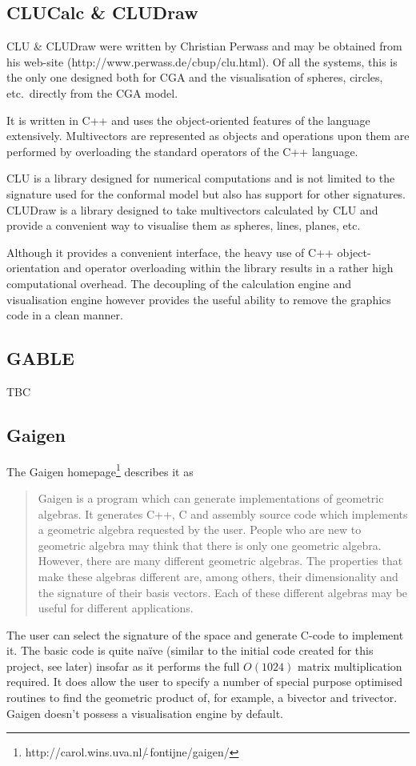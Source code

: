 \subsection{CLUCalc \& CLUDraw}


CLU \& CLUDraw were written by Christian Perwass and may be obtained from his
web-site (http://www.perwass.de/cbup/clu.html). Of all the systems, this
is the only one designed both for CGA and the visualisation of spheres,
circles, etc.\ directly from the CGA model.

It is written in C++ and uses the object-oriented features of the language
extensively. Multivectors are represented as objects and operations upon
them are performed by overloading the standard operators of the C++
language. 

CLU is a library designed for numerical computations and is not limited
to the signature used for the conformal model but also has support for
other signatures. CLUDraw is a library designed to take multivectors calculated
by CLU and provide a convenient way to visualise them as spheres, lines, planes,
etc. 

Although it provides a convenient interface, the heavy use of C++ object-orientation
and operator overloading within the library results in a rather high
computational overhead. The decoupling of the calculation engine and
visualisation engine however provides the useful ability to remove the
graphics code in a clean manner.


\subsection{GABLE}

TBC

\subsection{Gaigen}

The Gaigen 
homepage\footnote{http://carol.wins.uva.nl/$\tilde{\ }$fontijne/gaigen/} describes 
it as
\begin{quote}
Gaigen is a program which can generate implementations of geometric algebras. It generates C++, C and assembly source code which implements a geometric algebra requested by the user. People who are new to geometric algebra may think that there is only one geometric algebra. However, there are many different geometric algebras. The properties that make these algebras different are, among others, their dimensionality and the signature of their basis vectors. Each of these different algebras may be useful for different applications.
\end{quote}
The user can select the signature of the space and generate C-code to implement it. The
basic code is quite na\"ive (similar to the initial code created for
this project, see later) insofar as it
performs the full $O(1024)$ matrix multiplication required. It does allow the
user to specify a number of special purpose optimised routines to
find the geometric product of, for example, a bivector and trivector.
Gaigen doesn't possess a visualisation engine by default.


